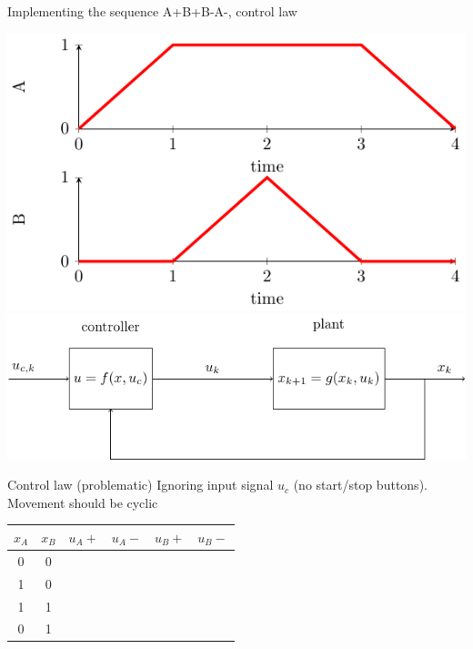 \documentclass[presentation,aspectratio=1610]{beamer}
\begin{document}
\begin{frame}[label={sec:org8d7ec46}]{Implementing the sequence A+B+B-A-, control law}
\begin{center}
\includegraphics[width=0.3\linewidth]{../../figures/AplusBplusBminAmin}
\includegraphics[width=0.68\linewidth]{../../figures/logic-control-loop}
\end{center}
\begin{block}{Control law (problematic)}
Ignoring input signal \(u_c\) (no start/stop buttons). Movement should be cyclic

\begin{center}
\begin{tabular}{|cc|cccc|}
\hline
\(x_A\) & \(x_B\) & \(u_A+\) & \(u_A-\) & \(u_B+\) & \(u_B-\)\\
\hline
0 & 0 &  &  &  & \\
1 & 0 &  &  &  & \\
1 & 1 &  &  &  & \\
0 & 1 &  &  &  & \\
\hline
\end{tabular}
\end{center}
\end{block}
\end{frame}
\end{document}

